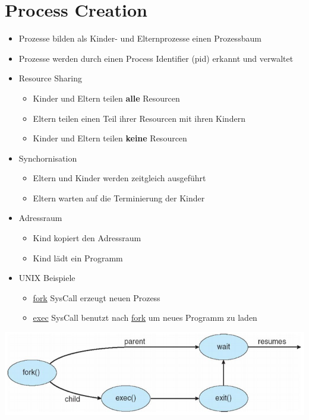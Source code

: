 \documentclass[a4paper]{scrreprt}
\begin{document}
\section{Process Creation}
	\begin{itemize}
		\item Prozesse bilden als Kinder- und Elternprozesse einen Prozessbaum
		\item Prozesse werden durch einen Process Identifier (pid) erkannt und verwaltet
		\item Resource Sharing
		\begin{itemize}
			\item Kinder und Eltern teilen \textbf{alle} Resourcen
			\item Eltern teilen einen Teil ihrer Resourcen mit ihren Kindern
			\item Kinder und Eltern teilen \textbf{keine} Resourcen
		\end{itemize}
		\item Synchornisation
		\begin{itemize}
			\item Eltern und Kinder werden zeitgleich ausgeführt
			\item Eltern warten auf die Terminierung der Kinder
		\end{itemize}
		\item Adressraum
		\begin{itemize}
			\item Kind kopiert den Adressraum
			\item Kind lädt ein Programm
		\end{itemize}
		\item UNIX Beispiele
		\begin{itemize}
			\item \underline{fork} SysCall erzeugt neuen Prozess
			\item \underline{exec} SysCall benutzt nach \underline{fork} um neues Programm zu laden
		\end{itemize}
	\end{itemize}
	\includegraphics[scale = 0.6]{graphics/process_fork.png}
\end{document}
